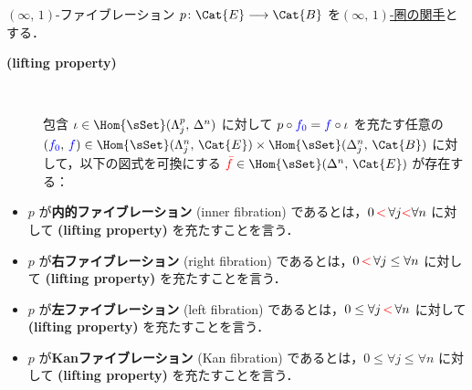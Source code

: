 \documentclass[TQFT_main]{subfiles}
\begin{document}
\begin{mydef}[label=def:infty-fib]{{$(\infty,\, 1)$}-ファイブレーション}
    $p \colon \Cat{E} \lto \Cat{B}$ を\hyperref[def:infty-1]{$(\infty,\, 1)$-圏の関手}とする．
    \begin{description}
        \item[\textbf{(lifting property)}]　
        
        包含 $\iota \in \Hom{\sSet}(\Lambda^p_j,\, \Delta^n)$ に対して $p \circ \textcolor{blue}{f_0} = \textcolor{blue}{f} \circ \iota$ を充たす任意の $(\textcolor{blue}{f_0},\, \textcolor{blue}{f}) \in \Hom{\sSet}(\Lambda^n_j,\, \Cat{E}) \times \Hom{\sSet}(\Delta^n_j,\, \Cat{B})$ に対して，以下の図式を可換にする $\textcolor{red}{\bar{f}} \in \Hom{\sSet}(\Delta^n,\, \Cat{E})$ が存在する：
        \begin{center}
        \end{center}
    \end{description}
    \tcblower
    \begin{itemize}
        \item $p$ が\textbf{内的ファイブレーション} (inner fibration) であるとは，$0 \,\textcolor{red}{<}\, \forall j \textcolor{red}{<} \forall n$ に対して \textsf{\textbf{(lifting property)}} を充たすことを言う．
        \item $p$ が\textbf{右ファイブレーション} (right fibration) であるとは，$0 \,\textcolor{red}{<}\, \forall j \le \forall n$ に対して \textsf{\textbf{(lifting property)}} を充たすことを言う．
        \item $p$ が\textbf{左ファイブレーション} (left fibration) であるとは，$0 \le \forall j \,\textcolor{red}{<}\, \forall n$ に対して \textsf{\textbf{(lifting property)}} を充たすことを言う．
        \item $p$ が\textbf{Kanファイブレーション} (Kan fibration) であるとは，$0 \le \forall j \le \forall n$ に対して \textsf{\textbf{(lifting property)}} を充たすことを言う．
    \end{itemize}
\end{mydef}
\end{document}
